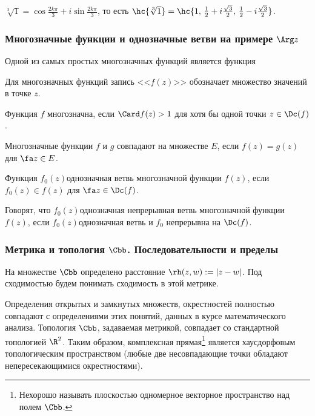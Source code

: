 \documentclass[a4paper]{article}
\begin{document}
\begin{ex}
$\sqrt[3]{1} = \cos \frac{2k\pi}{3} + i\sin \frac{2k\pi}{3}$, то есть
$\hc{\sqrt[3]{1}} = \hc{1,\, \frac{1}{2} + i\frac{\sqrt3}{2},\, \frac{1}{2} - i\frac{\sqrt3}{2}}$.
\end{ex}

\subsubsection{Многозначные функции и однозначные ветви на примере $\Arg z$}

Одной из самых простых многозначных функций является функция


Для многозначных функций запись <<$f(z)$>> обозначает множество значений в точке $z$.

\begin{df}
Функция $f$ многозначна, если $\Card f(z) > 1$ для хотя бы одной точки $z\in \Dc(f)$.
\end{df}

\begin{df}
Многозначные функции $f$ и $g$ совпадают на множестве $E$, если $f(z) = g(z)$ для $\fa z \in E$.
\end{df}

\begin{df}
Функция $f_0(z)$\т однозначная ветвь многозначной функции $f(z)$, если
$f_0(z) \in f(z)$ для $\fa z \in \Dc(f)$.
\end{df}

\begin{df}
Говорят, что $f_0(z)$\т однозначная непрерывная ветвь многозначной функции $f(z)$, если
$f_0(z)$\т однозначная ветвь и $f_0$ непрерывна на $\Dc(f)$.
\end{df}

\subsubsection{Метрика и топология $\Cbb$. Последовательности и пределы}

На множестве $\Cbb$ определено расстояние $\rh(z,w) := |z-w|$. Под сходимостью будем понимать
сходимость в этой метрике.

Определения открытых и замкнутых множеств, окрестностей  полностью совпадают с определениями этих понятий,
данных в курсе математического анализа. Топология $\Cbb$, задаваемая метрикой, совпадает со стандартной топологией $\R^2$.
Таким образом, комплексная прямая\footnote{Нехорошо называть плоскостью одномерное векторное пространство над полем $\Cbb$.}
является хаусдорфовым топологическим пространством (любые две несовпадающие точки обладают непересекающимися окрестностями).
\end{document}
